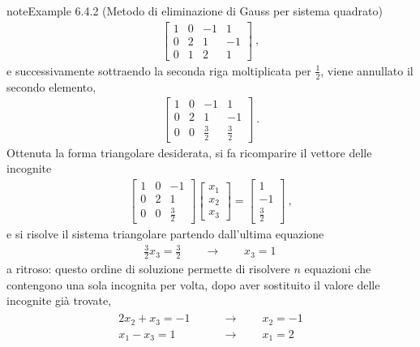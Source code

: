 \documentclass[letterpaper,10pt,italian]{jupyterBook}
\begin{document}
\begin{sphinxadmonition}{note}{Example 6.4.2 (Metodo di eliminazione di Gauss per sistema quadrato)}
\begin{equation*}
\begin{split}\left[\begin{array}{ccc|c} 1 & 0 & -1 & 1 \\ 0 & 2 & 1 & -1 \\ 0 & 1 &  2 & 1 \end{array} \right] \ ,\end{split}
\end{equation*}
\sphinxAtStartPar
e successivamente sottraendo la seconda riga moltiplicata per \(\frac{1}{2}\), viene annullato il secondo elemento,
\begin{equation*}
\begin{split}\left[\begin{array}{ccc|c} 1 & 0 & -1 & 1 \\ 0 & 2 & 1 & -1 \\ 0 & 0 & \frac{3}{2} & \frac{3}{2} \end{array} \right] \ .\end{split}
\end{equation*}
\sphinxAtStartPar
Ottenuta la forma triangolare desiderata, si fa ricomparire il vettore delle incognite
\begin{equation*}
\begin{split}
\begin{bmatrix} 1 & 0 & -1 \\ 0 & 2 & 1 \\ 0 &  0 & \frac{3}{2} \end{bmatrix} \begin{bmatrix} x_1 \\ x_2 \\ x_3 \end{bmatrix} =  \begin{bmatrix} 1 \\ -1 \\ \frac{3}{2} \end{bmatrix} \ ,
\end{split}
\end{equation*}
\sphinxAtStartPar
e si risolve il sistema triangolare partendo dall’ultima equazione
\begin{equation*}
\begin{split}\frac{3}{2} x_3 = \frac{3}{2} \qquad \rightarrow \qquad x_3 = 1 \, \end{split}
\end{equation*}
\sphinxAtStartPar
a ritroso: questo ordine di soluzione permette di risolvere \(n\) equazioni che contengono una sola incognita per volta, dopo aver sostituito il valore delle incognite già trovate,
\begin{equation*}
\begin{split}\begin{aligned}
 2 x_2 + x_3 = - 1 \qquad & \rightarrow \qquad x_2 = -1 \\
   x_1 - x_3 =   1 \qquad & \rightarrow \qquad x_1 =  2 \\
\end{aligned}\end{split}
\end{equation*}\end{sphinxadmonition}
\end{document}
